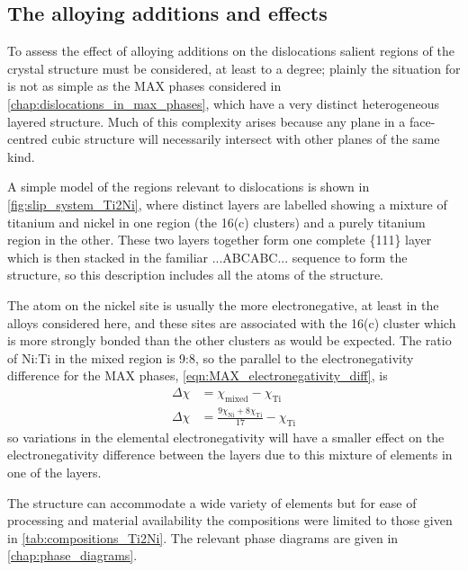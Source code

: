 \subsection{The alloying additions and effects}

To assess the effect of alloying additions on the dislocations salient regions of the crystal structure must be considered, at least to a degree; plainly the situation for  is not as simple as the MAX phases considered in \autoref{chap:dislocations_in_max_phases}, which have a very distinct heterogeneous layered structure. Much of this complexity arises because any plane in a face-centred cubic structure will necessarily intersect with other planes of the same kind.

A simple model of the regions relevant to dislocations is shown in \autoref{fig:slip_system_Ti2Ni}, where distinct layers are labelled showing a mixture of titanium and nickel in one region (the 16(c) clusters) and a purely titanium region in the other. These two layers together form one complete \{111\} layer which is then stacked in the familiar ...ABCABC... sequence to form the structure, so this description includes all the atoms of the structure.

The atom on the nickel site is usually the more electronegative, at least in the alloys considered here, and these sites are associated with the 16(c) cluster which is more strongly bonded than the other clusters as would be expected. The ratio of Ni:Ti in the mixed region is 9:8, so the parallel to the electronegativity difference for the MAX phases, \autoref{eqn:MAX_electronegativity_diff}, is
\begin{align}
\Delta \chi &= \chi_{\text{mixed}} - \chi_{\text{Ti}} \nonumber\\
\Delta \chi &= \frac{9\chi_{\text{Ni}} + 8\chi_{\text{Ti}}}{17} - \chi_{\text{Ti}}
\end{align}
so variations in the elemental electronegativity will have a smaller effect on the electronegativity difference between the layers due to this mixture of elements in one of the layers.

The  structure can accommodate a wide variety of elements but for ease of processing and material availability the compositions were limited to those given in \autoref{tab:compositions_Ti2Ni}. The relevant phase diagrams are given in \autoref{chap:phase_diagrams}.


